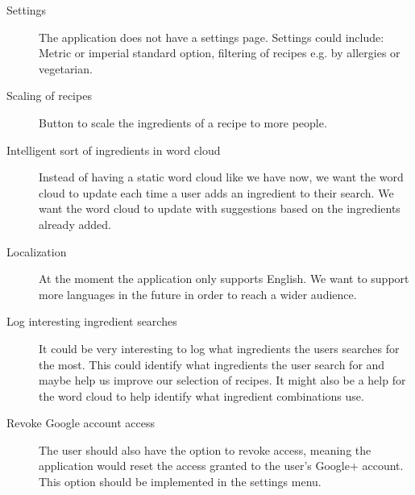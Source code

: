 \begin{description}
\item[Settings] The application does not have a settings page. Settings could include: Metric or imperial standard option, filtering of recipes e.g. by allergies or vegetarian.

\item[Scaling of recipes] Button to scale the ingredients of a recipe to more people.

\item [Intelligent sort of ingredients in word cloud] Instead of having a static word cloud like we have now, we want the word cloud to update each time a user adds an ingredient to their search. We want the word cloud to update with suggestions based on the ingredients already added. 

\item [Localization] At the moment the application only supports English. We want to support more languages in the future in order to reach a wider audience.
\item [Log interesting ingredient searches] It could be very interesting to log what ingredients the users searches for the most. This could identify what ingredients the user search for and maybe help us improve our selection of recipes. It might also be a help for the word cloud to help identify what ingredient combinations use.
\item [Revoke Google account access]
The user should also have the option to revoke access, meaning the application would reset the access granted to the user's Google+ account.
This option should be implemented in the settings menu.
\end{description}
